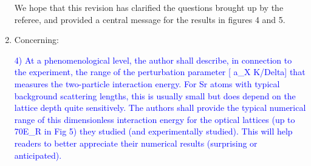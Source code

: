 \documentclass[preprint]{revtex4-1}
\newcommand{\1}{\mathds{1}}
\newcommand{\blue}[1]{\textcolor{blue}{#1}}
\begin{document}
\begin{enumerate}
  We hope that this revision has clarified the questions brought up by
  the referee, and provided a central message for the results in
  figures 4 and 5.


\item Concerning:

  \blue{4) At a phenomenological level, the author shall describe, in
    connection to the experiment, the range of the perturbation
    parameter [ a\_X K/Delta] that measures the two-particle
    interaction energy. For Sr atoms with typical background
    scattering lengths, this is usually small but does depend on the
    lattice depth quite sensitively.  The authors shall provide the
    typical numerical range of this dimensionless interaction energy
    for the optical lattices (up to 70E\_R in Fig 5) they studied (and
    experimentally studied). This will help readers to better
    appreciate their numerical results (surprising or anticipated).}




\end{enumerate}
\end{document}
